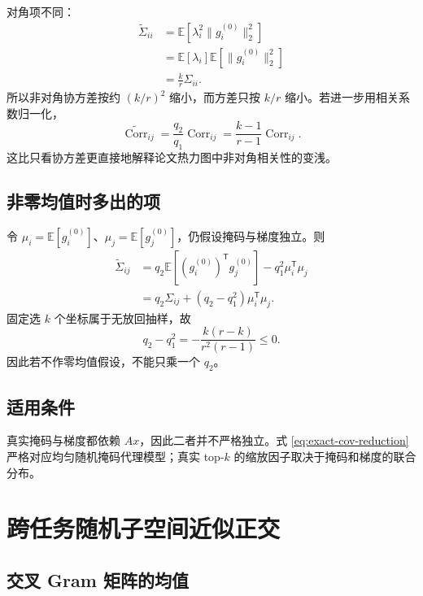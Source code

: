 \documentclass[11pt]{article}
\numberwithin{equation}{section}
\newcommand{\E}{\mathbb{E}}
\newcommand{\1}{\mathbf{1}}
\begin{document}
对角项不同：
\begin{align}
  \widetilde\Sigma_{ii}
  &=\E[\lambda_i^2\|g_i^{(0)}\|_2^2]\\
  &=\E[\lambda_i]\E[\|g_i^{(0)}\|_2^2]\\
  &=\frac kr\Sigma_{ii}.
  \label{eq:diag-cov}
\end{align}
所以非对角协方差按约 $(k/r)^2$ 缩小，而方差只按 $k/r$ 缩小。若进一步用相关系数归一化，
\begin{equation}
  \widetilde{\operatorname{Corr}}_{ij}
  =\frac{q_2}{q_1}
   \operatorname{Corr}_{ij}
  =\frac{k-1}{r-1}\operatorname{Corr}_{ij}.
  \label{eq:corr-reduction}
\end{equation}
这比只看协方差更直接地解释论文热力图中非对角相关性的变浅。

\subsection{非零均值时多出的项}

令 $\mu_i=\E[g_i^{(0)}]$、$\mu_j=\E[g_j^{(0)}]$，仍假设掩码与梯度独立。则
\begin{align}
  \widetilde\Sigma_{ij}
  &=q_2\E[(g_i^{(0)})^{\mathsf{T}}g_j^{(0)}]
    -q_1^2\mu_i^{\mathsf{T}}\mu_j\\
  &=q_2\Sigma_{ij}
    +(q_2-q_1^2)\mu_i^{\mathsf{T}}\mu_j.
  \label{eq:nonzero-mean-cov}
\end{align}
固定选 $k$ 个坐标属于无放回抽样，故
\begin{equation}
  q_2-q_1^2
  =-\frac{k(r-k)}{r^2(r-1)}\le0.
\end{equation}
因此若不作零均值假设，不能只乘一个 $q_2$。

\subsection{适用条件}

真实掩码与梯度都依赖 $Ax$，因此二者并不严格独立。式 \eqref{eq:exact-cov-reduction} 严格对应均匀随机掩码代理模型；真实 top-$k$ 的缩放因子取决于掩码和梯度的联合分布。

\section{跨任务随机子空间近似正交}

\subsection{交叉 Gram 矩阵的均值}
\end{document}
